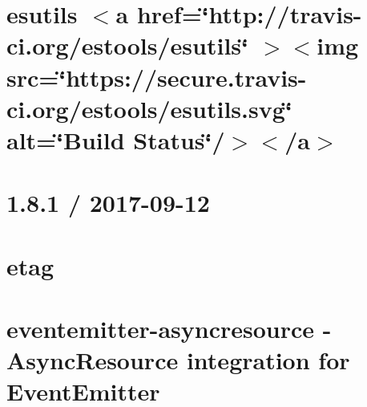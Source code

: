\documentclass[twoside]{book}
\newcommand{\+}{\discretionary{\mbox{\scriptsize$\hookleftarrow$}}{}{}}
\begin{document}
\chapter{esutils \texorpdfstring{$<$}{<}a href=\char`\"{}http\+://travis-\/ci.\+org/estools/esutils\char`\"{} \texorpdfstring{$>$}{>}\texorpdfstring{$<$}{<}img src=\char`\"{}https\+://secure.\+travis-\/ci.\+org/estools/esutils.\+svg\char`\"{} alt=\char`\"{}\+Build Status\char`\"{}/\texorpdfstring{$>$}{>}\texorpdfstring{$<$}{<}/a\texorpdfstring{$>$}{>}}
\label{md__c___users_vaishnavi_jadhav__desktop__developer_code_mean_stack_example_client_node_modules_esutils__r_e_a_d_m_e}

\chapter{1.8.1 / 2017-\/09-\/12}
\label{md__c___users_vaishnavi_jadhav__desktop__developer_code_mean_stack_example_client_node_modules_etag__h_i_s_t_o_r_y}

\chapter{etag}
\label{md__c___users_vaishnavi_jadhav__desktop__developer_code_mean_stack_example_client_node_modules_etag__r_e_a_d_m_e}

\chapter{eventemitter-\/asyncresource -\/ Async\+Resource integration for Event\+Emitter}
\label{md__c___users_vaishnavi_jadhav__desktop__developer_code_mean_stack_example_client_node_modules_ecb06bab933f4ec3c788720ba497e2ed2}

\end{document}
